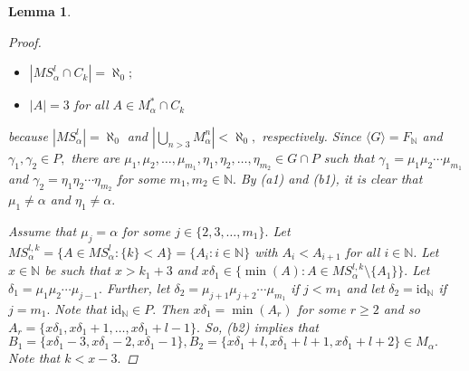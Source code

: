 \documentclass[11pt]{article}
\theoremstyle{plain}
\newtheorem{lemma}[theorem]{Lemma}
\theoremstyle{definition}
\newcommand{\identity}{\mathrm{id}}
\begin{document}
\begin{lemma}
\begin{proof}
\begin{itemize}
\item[(b1)] $\left\vert MS_{\alpha}^{l}\cap C_{k}\right\vert=\aleph_{0};$
\item[(b2)] $\left\vert A\right\vert=3$ for all $A\in M_{\alpha}^{*}\cap C_{k}$
\end{itemize}
because $\left\vert MS^{l}_{\alpha}\right\vert=\aleph_{0}$ and $\left\vert\bigcup_{n>3} M^{n}_{\alpha}\right\vert<\aleph_{0},$ respectively.
Since $\langle G\rangle=F_{\mathbb{N}}$ and $\gamma_{1},\gamma_{2}\in P,$ there are $\mu_{1},\mu_{2},\ldots,\mu_{m_{1}},\eta_{1},\eta_{2},\ldots,\eta_{m_{2}}\in G\cap P$ such that $\gamma_{1}=\mu_{1}\mu_{2}\cdots\mu_{m_{1}}$ and $\gamma_{2}=\eta_{1}\eta_{2}\cdots\eta_{m_{2}}$ for some $m_{1},m_{2}\in\mathbb{N}.$ By (a1) and (b1), it is clear that $\mu_{1}\not=\alpha$ and $\eta_{1}\not=\alpha.$

Assume that $\mu_{j}=\alpha$ for some $j\in\{2,3,\ldots,m_{1}\}.$ Let $MS_{\alpha}^{l,k}=\{A\in MS_{\alpha}^{l}: \{k\}<A\}=\{A_{i}:i\in\mathbb{N}\}$ with $A_{i}<A_{i+1}$ for all $i\in\mathbb{N}.$ Let $x\in\mathbb{N}$ be such that $x>k_{1}+3$ and $x\delta_{1}\in\{\min(A):A\in MS_{\alpha}^{l,k}\setminus\{A_{1}\}\}.$ Let $\delta_{1}=\mu_{1}\mu_{2}\cdots\mu_{j-1}.$ Further, let $\delta_{2}=\mu_{j+1}\mu_{j+2}\cdots\mu_{m_{1}}$ if $j<m_{1}$ and let $\delta_{2}=\identity_{\mathbb{N}}$ if $j=m_{1}.$ Note that $\identity_{\mathbb{N}}\in P.$ Then $x\delta_{1}=\min(A_{r})$ for some $r\geq 2$ and so $A_{r}=\{x\delta_{1},x\delta_{1}+1,\ldots,x\delta_{1}+l-1\}.$ So, (b2) implies that $B_{1}=\{x\delta_{1}-3,x\delta_{1}-2,x\delta_{1}-1\},B_{2}=\{x\delta_{1}+l,x\delta_{1}+l+1,x\delta_{1}+l+2\}\in M_{\alpha}.$ Note that $k<x-3.$ 
 

\end{proof}
\end{lemma}
\end{document}
